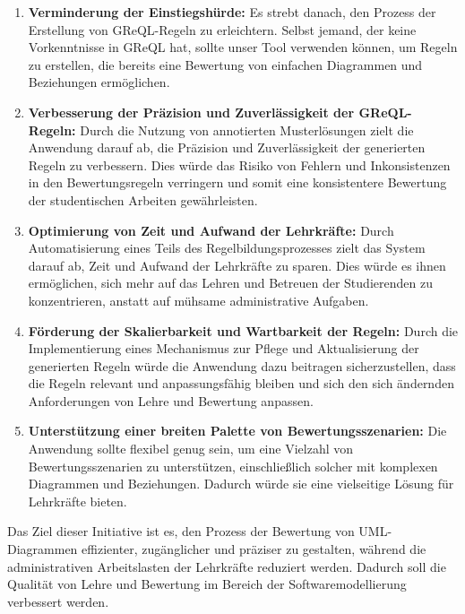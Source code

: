 \begin{enumerate}[itemsep=8pt, parsep=5pt]
    \item \textbf{Verminderung der Einstiegshürde:} Es strebt danach, den Prozess der Erstellung von GReQL-Regeln zu erleichtern. Selbst jemand, der keine Vorkenntnisse in GReQL hat, sollte unser Tool verwenden können, um Regeln zu erstellen, die bereits eine Bewertung von einfachen Diagrammen und Beziehungen ermöglichen.
    
    \item \textbf{Verbesserung der Präzision und Zuverlässigkeit der GReQL-Regeln:}
    Durch die Nutzung von annotierten Musterlösungen zielt die Anwendung darauf ab, die Präzision und Zuverlässigkeit der generierten Regeln zu verbessern. Dies würde das Risiko von Fehlern und Inkonsistenzen in den Bewertungsregeln verringern und somit eine konsistentere Bewertung der studentischen Arbeiten gewährleisten.
    
    \item \textbf{Optimierung von Zeit und Aufwand der Lehrkräfte:}
    Durch Automatisierung eines Teils des Regelbildungsprozesses zielt das System darauf ab, Zeit und Aufwand der Lehrkräfte zu sparen. Dies würde es ihnen ermöglichen, sich mehr auf das Lehren und Betreuen der Studierenden zu konzentrieren, anstatt auf mühsame administrative Aufgaben.
    
    \item \textbf{Förderung der Skalierbarkeit und Wartbarkeit der Regeln:}
    Durch die Implementierung eines Mechanismus zur Pflege und Aktualisierung der generierten Regeln würde die Anwendung dazu beitragen sicherzustellen, dass die Regeln relevant und anpassungsfähig bleiben und sich den sich ändernden Anforderungen von Lehre und Bewertung anpassen.
    
    \item \textbf{Unterstützung einer breiten Palette von Bewertungsszenarien:}
    Die Anwendung sollte flexibel genug sein, um eine Vielzahl von Bewertungsszenarien zu unterstützen, einschließlich solcher mit komplexen Diagrammen und Beziehungen. Dadurch würde sie eine vielseitige Lösung für Lehrkräfte bieten.
    
\end{enumerate}

Das Ziel dieser Initiative ist es, den Prozess der Bewertung von UML-Diagrammen effizienter, zugänglicher und präziser zu gestalten, während die administrativen Arbeitslasten der Lehrkräfte reduziert werden. Dadurch soll die Qualität von Lehre und Bewertung im Bereich der Softwaremodellierung verbessert werden.
